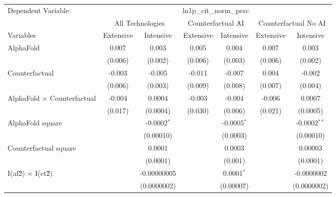 \begingroup
\centering
\begin{tabular}{lcccccc}
   \tabularnewline \midrule \midrule
   Dependent Variable: & \multicolumn{6}{c}{ln1p\_cit\_norm\_perc}\\
 & \multicolumn{2}{c}{All Technologies} & \multicolumn{2}{c}{Counterfactual AI} & \multicolumn{2}{c}{Counterfactual No AI} \\
\cmidrule(lr){1-1}\cmidrule(lr){2-3} \cmidrule(lr){4-5} \cmidrule(lr){6-7}
Variables & \multicolumn{1}{c}{Extensive} & \multicolumn{1}{c}{Intensive} & \multicolumn{1}{c}{Extensive} & \multicolumn{1}{c}{Intensive} & \multicolumn{1}{c}{Extensive} & \multicolumn{1}{c}{Intensive} \\
\cmidrule(lr){1-1}\cmidrule(lr){2-2} \cmidrule(lr){3-3} \cmidrule(lr){4-4} \cmidrule(lr){5-5} \cmidrule(lr){6-6} \cmidrule(lr){7-7}
   AlphaFold                          & 0.007   & 0.003         & 0.005   & 0.004         & 0.007   & 0.003\\   
                                      & (0.006) & (0.002)       & (0.006) & (0.003)       & (0.006) & (0.002)\\   
   Counterfactual                     & -0.003  & -0.005        & -0.011  & -0.007        & 0.004   & -0.002\\   
                                      & (0.006) & (0.003)       & (0.009) & (0.008)       & (0.007) & (0.004)\\   
   AlphaFold $\times$ Counterfactual  & -0.004  & 0.0004        & -0.003  & -0.004        & -0.006  & 0.0007\\   
                                      & (0.017) & (0.0004)      & (0.030) & (0.006)       & (0.021) & (0.0005)\\   
   AlphaFold square                   &         & -0.0002$^{*}$ &         & -0.0005$^{*}$ &         & -0.0002$^{**}$\\   
                                      &         & (0.00010)     &         & (0.0003)      &         & (0.00010)\\   
   Counterfactual square              &         & 0.0001        &         & 0.0003        &         & 0.00003\\   
                                      &         & (0.0001)      &         & (0.001)       &         & (0.0001)\\   
   I(af\^2) $\times$ I(ct\^2)         &         & -0.00000005   &         & 0.0001$^{*}$  &         & -0.0000002\\   
                                      &         & (0.0000002)   &         & (0.00007)     &         & (0.0000002)\\   

\end{tabular}
